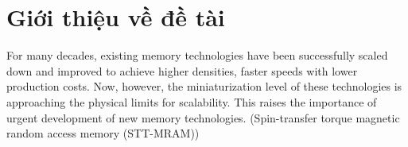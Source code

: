 \section{Giới thiệu về đề tài}
\label{sec:introduction}

For many decades, existing memory technologies have been successfully scaled
down and improved to achieve higher densities, faster speeds with lower
production costs.  Now, however, the miniaturization level of these
technologies is approaching the physical limits for scalability. This raises
the importance of urgent development of new memory technologies. (Spin-transfer torque magnetic random access memory (STT-MRAM))